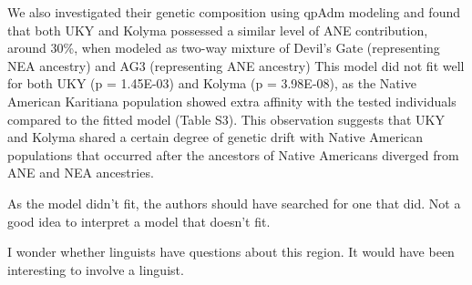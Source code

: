   We also investigated their genetic composition using qpAdm modeling
  and found that both UKY and Kolyma possessed a similar level of ANE
  contribution, around 30\%, when modeled as two-way mixture of
  Devil's Gate (representing NEA ancestry) and AG3 (representing ANE
  ancestry) This model did not fit well for both UKY (p = 1.45E-03)
  and Kolyma (p = 3.98E-08), as the Native American Karitiana
  population showed extra affinity with the tested individuals
  compared to the fitted model (Table S3). This observation suggests
  that UKY and Kolyma shared a certain degree of genetic drift with
  Native American populations that occurred after the ancestors of
  Native Americans diverged from ANE and NEA ancestries.

  As the model didn't fit, the authors should have searched for one
  that did. Not a good idea to interpret a model that doesn't fit.

I wonder whether linguists have questions about this region. It would
have been interesting to involve a linguist.


